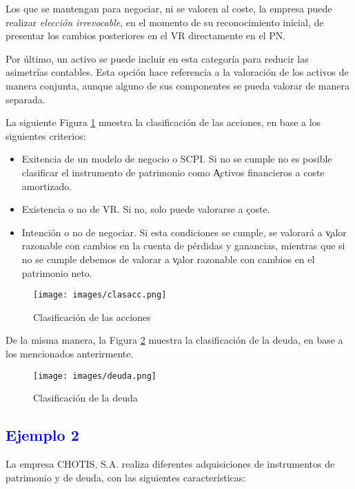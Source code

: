 Los que se mantengan para negociar, ni se valoren al coste, la empresa puede realizar \textit{elección irrevocable}, en el momento de su reconocimiento inicial, de presentar los cambios posteriores en el VR directamente en el PN.

Por último, un activo se puede incluir en esta categoría para reducir las asimetrías contables. Esta opción hace referencia a la valoración de los activos de manera conjunta, aunque alguno de sus componentes se pueda valorar de manera separada.

La siguiente Figura \ref{fig:Acciones} muestra la clasificación de las acciones, en base a los siguientes criterios:

\begin{itemize}
    \item Exitencia de un modelo de negocio o SCPI. Si no se cumple no es posible clasificar el instrumento de patrimonio como \c{Activos financieros a coste amortizado}.
    \item Existencia o no de VR. Si no, solo puede valorarse a \c{coste}.  
    \item Intención o no de negociar. Si esta condiciones se cumple, se valorará a \c{valor razonable con cambios en la cuenta de pérdidas y ganancias}, mientras que si no se cumple debemos de valorar a \c{valor razonable con cambios en el patrimonio neto}.
\end{itemize}

\begin{figure}[H]
    \centering
    \texttt{[image: images/clasacc.png]}
    \caption{Clasificación de las acciones}
    \label{fig:Acciones}
\end{figure}

De la misma manera, la Figura \ref{fig:Deuda} muestra la clasificación de la deuda, en base a los mencionados anterirmente.

\begin{figure}[H]
    \centering
    \texttt{[image: images/deuda.png]}
    \caption{Clasificación de la deuda}
    \label{fig:Deuda}
\end{figure}

\subsection*{\textcolor{blue}{Ejemplo 2}}

La empresa CHOTIS, S.A. realiza diferentes adquisiciones de instrumentos de patrimonio y de deuda, con las siguientes características:

